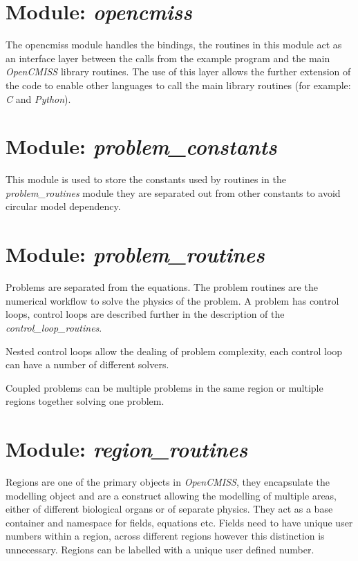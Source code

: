\section{Module: \emph{opencmiss}}
\label{sec:opencmiss}

The opencmiss module handles the bindings, the routines in this module act as 
an interface layer between the calls from the example program and the main 
\emph{OpenCMISS} library routines. The use of this layer allows the further 
extension of the code to enable other languages to call the main library 
routines (for example: \emph{C} and \emph{Python}).


\section{Module: \emph{problem\_constants}}
\label{sec:problemconstants}

This module is used to store the constants used by routines in the 
\emph{problem\_routines} module they are separated out from other 
constants to avoid circular model dependency.


\section{Module: \emph{problem\_routines}}
\label{sec:problemroutines}

Problems are separated from the equations. The problem routines are the 
numerical workflow to solve the physics of the problem. A problem has control 
loops, control loops are described further in the description of the 
\emph{control\_loop\_routines}.

Nested control loops allow the dealing of problem complexity, each control 
loop can have a number of different solvers.

Coupled problems can be multiple problems in the same region or multiple 
regions together solving one problem.


\section{Module: \emph{region\_routines}}
\label{sec:regionroutines}

Regions are one of the primary objects in \emph{OpenCMISS}, they encapsulate 
the modelling object and are a construct allowing the modelling of multiple 
areas, either of different biological organs or of separate physics. They act 
as a base container and namespace for fields, equations etc. Fields need to 
have unique user numbers within a region, across different regions however 
this distinction is unnecessary. Regions can be labelled with a unique user 
defined number. 

